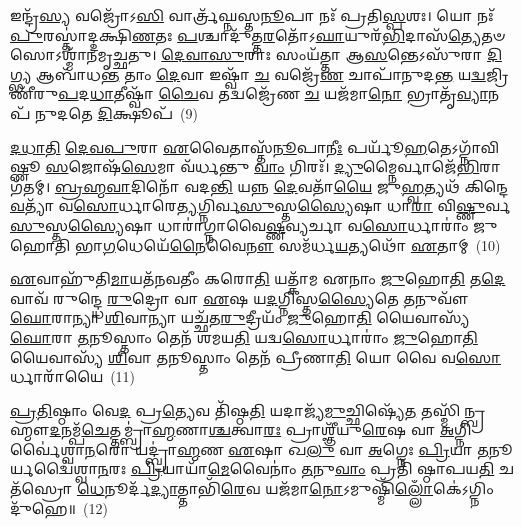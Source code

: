 {\anuvakamend[{\-\ul{𑌪𑍍𑌰𑌾}\-\-\ul{𑌜𑌾}\-\-\ul{𑌪}\-𑌤𑍍𑌯𑌾\-\ul{𑌲𑍍𑌲𑍋𑌁}\-𑌕𑌾𑌯᳴ 𑌦𑍇𑌵𑌾𑌃 𑌪𑌿𑌤𑍋 𑌦𑌧𑍍𑌯𑌾𑌦𑌾𑌗𑍍𑌰\-\ul{𑌯}\-𑌣𑌂 𑌪𑌞𑍍𑌚᳴𑌵𑌿𑍞𑌶𑌤𑌿𑌶𑍍𑌚}]}%

𑌇𑌨𑍍𑌦𑍍𑌰᳴\-\ul{𑌸𑍍𑌯} 𑌵𑌜𑍍𑌰𑍋᳴\-𑌽\-\ul{𑌸𑌿} 𑌵𑌾𑌰𑍍𑌤𑍍𑌰᳴𑌘𑍍𑌨𑌸𑍍𑌤\-\ul{𑌨𑍂}\-𑌪𑌾 𑌨𑌃᳴ 𑌪𑍍𑌰𑌤𑌿\-\ul{𑌸𑍍𑌪}\-𑌶𑌃। 𑌯𑍋 𑌨𑌃᳴ \ul{𑌪𑍁}\-𑌰𑌸𑍍𑌤𑌾॑𑌦𑍍𑌦𑌕𑍍𑌷𑌿\-\ul{𑌣}\-𑌤𑌃 \ul{𑌪}\-𑌶𑍍𑌚𑌾𑌦𑍁᳴𑌤𑍍𑌤\-\ul{𑌰}\-𑌤𑍋᳴\-𑌽\-\ul{𑌘𑌾}\-𑌯𑍁𑌰᳴\-\ul{𑌭𑌿}\-𑌦𑌾𑌸᳴\-\ul{𑌤𑍍𑌯𑍇}\-𑌤𑍞 𑌸𑍋\-𑌽𑌶𑍍𑌮𑌾᳴𑌨𑌮𑍃𑌚𑍍𑌛𑌤𑍁। \ul{𑌦𑍇}\-\-\ul{𑌵𑌾}\-\-\ul{𑌸𑍁}\-𑌰𑌾𑌃 𑌸𑌂𑌯᳴𑌤𑍍𑌤𑌾 𑌆\-\ul{𑌸}\-𑌨𑍍𑌤𑍇\-𑌽𑌸𑍁᳴𑌰𑌾 \ul{𑌦𑌿}\-𑌗𑍍𑌭𑍍𑌯 𑌆𑌬𑌾᳴𑌧\-\ul{𑌨𑍍𑌤} 𑌤𑌾𑌂 \ul{𑌦𑍇}\-𑌵𑌾 𑌇𑌷𑍍𑌵𑌾᳴ \ul{𑌚} 𑌵𑌜𑍍𑌰𑍇᳴\-\ul{𑌣} 𑌚𑌾𑌪𑌾᳴𑌨𑍁𑌦\-\ul{𑌨𑍍𑌤} 𑌯\-\ul{𑌦𑍍𑌵}\-𑌜𑍍𑌰𑌿𑌣𑍀᳴𑌰𑍁\-\ul{𑌪}\-𑌦\-\ul{𑌧𑌾}\-𑌤𑍀𑌷𑍍𑌵𑌾᳴ \ul{𑌚𑍈}\-𑌵 𑌤𑌦𑍍𑌵𑌜𑍍𑌰𑍇᳴𑌣 \ul{𑌚} 𑌯𑌜᳴𑌮𑌾\-\ul{𑌨𑍋} 𑌭𑍍𑌰𑌾𑌤𑍃᳴\-\ul{𑌵𑍍𑌯𑌾}\-𑌨𑌪᳴ 𑌨𑍁𑌦𑌤𑍇 \ul{𑌦𑌿}\-𑌕𑍍𑌷𑍂𑌪᳴~(9)

\-\ul{𑌦}\-\-\ul{𑌧𑌾}\-\-\ul{𑌤𑌿} \ul{𑌦𑍇}\-\-\ul{𑌵}\-\-\ul{𑌪𑍁}\-𑌰𑌾 \ul{𑌏}\-𑌵𑍈𑌤𑌾𑌸𑍍𑌤᳴\-\ul{𑌨𑍂}\-𑌪𑌾\-\ul{𑌨𑍀𑌃} 𑌪𑌰𑍍𑌯𑍂᳴\-\ul{𑌹}\-𑌤𑍇\-𑌽𑌗𑍍𑌨𑌾᳴𑌵𑌿𑌷𑍍𑌣𑍂 \ul{𑌸}\-𑌜𑍋𑌷᳴\-\ul{𑌸𑍇}\-𑌮𑌾 𑌵᳴𑌰𑍍𑌧𑌨𑍍𑌤𑍁 \ul{𑌵𑌾𑌂} 𑌗𑌿𑌰𑌃᳴। \ul{𑌦𑍍𑌯𑍁}\-𑌮𑍍𑌨𑍈𑌰𑍍𑌵𑌾𑌜𑍇᳴\-\ul{𑌭𑌿}\-𑌰𑌾 𑌗᳴𑌤𑌮𑍍। \ul{𑌬𑍍𑌰}\-\-\ul{𑌹𑍍𑌮}\-\-\ul{𑌵𑌾}\-𑌦𑌿𑌨𑍋᳴ 𑌵𑌦\-\ul{𑌨𑍍𑌤𑌿} 𑌯𑌨𑍍𑌨 \ul{𑌦𑍇}\-𑌵𑌤𑌾᳴\-\ul{𑌯𑍈} 𑌜𑍁\-\ul{𑌹𑍍𑌵}\-𑌤𑍍𑌯𑌥᳴ 𑌕𑌿𑌨𑍍𑌦𑍇\-\ul{𑌵}\-𑌤𑍍𑌯𑌾᳴ 𑌵\-\ul{𑌸𑍋}\-𑌰𑍍𑌧𑌾𑌰𑍇\-\ul{𑌤𑍍𑌯}\-𑌗𑍍𑌨𑌿𑌰𑍍𑌵\-\ul{𑌸𑍁}\-𑌸𑍍𑌤\-\ul{𑌸𑍍𑌯𑍈}\-𑌷𑌾 𑌧𑌾\-\ul{𑌰𑌾} 𑌵𑌿\-\ul{𑌷𑍍𑌣𑍁}\-𑌰𑍍𑌵\-\ul{𑌸𑍁}\-𑌸𑍍𑌤\-\ul{𑌸𑍍𑌯𑍈}\-𑌷𑌾 𑌧𑌾𑌰𑌾॑𑌗𑍍𑌨𑌾𑌵𑍈\-\ul{𑌷𑍍𑌣}\-𑌵𑍍𑌯𑌰𑍍𑌚𑌾 𑌵\-\ul{𑌸𑍋}\-𑌰𑍍𑌧𑌾𑌰𑌾𑌂॑ 𑌜𑍁𑌹𑍋𑌤𑌿 𑌭𑌾\-\ul{𑌗}\-𑌧𑍇𑌯𑍇᳴\-\ul{𑌨𑍈}\-𑌵𑍈\-\ul{𑌨𑍗} 𑌸𑌮᳴𑌰𑍍𑌧\-\ul{𑌯}\-𑌤𑍍𑌯𑌥𑍋᳴ \ul{𑌏}\-𑌤𑌾𑌮𑍍~(10)

\-\ul{𑌏}\-𑌵𑌾𑌹𑍁᳴𑌤𑌿\-\ul{𑌮𑌾}\-𑌯𑌤᳴𑌨𑌵𑌤𑍀𑌂 𑌕𑌰𑍋\-\ul{𑌤𑌿} 𑌯𑌤𑍍𑌕𑌾᳴𑌮 𑌏𑌨𑌾𑌂 \ul{𑌜𑍁}\-𑌹𑍋\-\ul{𑌤𑌿} 𑌤\-\ul{𑌦𑍇}\-𑌵𑌾𑌵᳴ 𑌰𑍁𑌨𑍍𑌦𑍍𑌧𑍇 \ul{𑌰𑍁}\-𑌦𑍍𑌰𑍋 𑌵𑌾 \ul{𑌏}\-𑌷 𑌯\-\ul{𑌦}\-𑌗𑍍𑌨𑌿𑌸𑍍𑌤\-\ul{𑌸𑍍𑌯𑍈}\-𑌤𑍇 \ul{𑌤}\-𑌨𑍁𑌵𑍗᳴ \ul{𑌘𑍋}\-𑌰𑌾𑌨𑍍𑌯𑌾 \ul{𑌶𑌿}\-𑌵𑌾𑌨𑍍𑌯𑌾 𑌯𑌚𑍍𑌛᳴𑌤\-\ul{𑌰𑍁}\-𑌦𑍍𑌰𑍀𑌯𑌂᳴ \ul{𑌜𑍁}\-𑌹𑍋\-\ul{𑌤𑌿} 𑌯𑍈𑌵𑌾𑌸𑍍𑌯᳴ \ul{𑌘𑍋}\-𑌰𑌾 \ul{𑌤}\-𑌨𑍂𑌸𑍍𑌤𑌾𑌂 𑌤𑍇𑌨᳴ 𑌶𑌮𑌯\-\ul{𑌤𑌿} 𑌯𑌦𑍍𑌵\-\ul{𑌸𑍋}\-𑌰𑍍𑌧𑌾𑌰𑌾𑌂॑ \ul{𑌜𑍁}\-𑌹𑍋\-\ul{𑌤𑌿} 𑌯𑍈𑌵𑌾𑌸𑍍𑌯᳴ \ul{𑌶𑌿}\-𑌵𑌾 \ul{𑌤}\-𑌨𑍂𑌸𑍍𑌤𑌾𑌂 𑌤𑍇𑌨᳴ 𑌪𑍍𑌰𑍀𑌣𑌾\-\ul{𑌤𑌿} 𑌯𑍋 𑌵𑍈 𑌵\-\ul{𑌸𑍋}\-𑌰𑍍𑌧𑌾𑌰𑌾᳴𑌯𑍈~(11)

\-\ul{𑌪𑍍𑌰}\-\-\ul{𑌤𑌿}\-𑌷𑍍𑌠𑌾𑌂 𑌵𑍇\-\ul{𑌦} 𑌪𑍍𑌰\-\ul{𑌤𑍍𑌯𑍇}\-𑌵 𑌤𑌿᳴𑌷𑍍𑌠\-\ul{𑌤𑌿} 𑌯𑌦𑌾𑌜𑍍𑌯᳴\-\ul{𑌮𑍁}\-𑌚𑍍𑌛𑌿𑌷𑍍𑌯𑍇᳴\-\ul{𑌤} 𑌤𑌸𑍍𑌮𑌿᳴𑌨𑍍𑌬𑍍𑌰𑌹𑍍𑌮𑍗\-\ul{𑌦}\-𑌨𑌮𑍍𑌪᳴\-\ul{𑌚𑍇}\-𑌤𑍍𑌤𑌮𑍍𑌬𑍍𑌰𑌾॑\-\ul{𑌹𑍍𑌮}\-𑌣𑌾\-\ul{𑌶𑍍𑌚}\-𑌤𑍍𑌵𑌾\-\ul{𑌰𑌃} 𑌪𑍍𑌰𑌾𑌶𑍍𑌞𑍀᳴𑌯𑍁\-\ul{𑌰𑍇}\-𑌷 𑌵𑌾 \ul{𑌅}\-𑌗𑍍𑌨𑌿𑌰𑍍𑌵𑍈॑𑌶𑍍𑌵𑌾\-\ul{𑌨}\-𑌰𑍋 𑌯𑌦𑍍𑌬𑍍𑌰𑌾॑\-\ul{𑌹𑍍𑌮}\-𑌣 \ul{𑌏}\-𑌷𑌾 𑌖\-\ul{𑌲𑍁} 𑌵𑌾 \ul{𑌅}\-𑌗𑍍𑌨𑍇𑌃 \ul{𑌪𑍍𑌰𑌿}\-𑌯𑌾 \ul{𑌤}\-𑌨𑍂𑌰𑍍𑌯𑌦𑍍𑌵𑍈॑𑌶𑍍𑌵𑌾\-\ul{𑌨}\-𑌰𑌃 \ul{𑌪𑍍𑌰𑌿}\-𑌯𑌾𑌯𑌾᳴\-\ul{𑌮𑍇}\-𑌵𑍈𑌨𑌾𑌂॑ \ul{𑌤}\-𑌨𑍁\-\ul{𑌵𑌾𑌂} 𑌪𑍍𑌰𑌤𑌿᳴ 𑌷𑍍𑌠𑌾𑌪𑌯\-\ul{𑌤𑌿} 𑌚𑌤᳴𑌸𑍍𑌰𑍋 \ul{𑌧𑍇}\-𑌨𑍂𑌰𑍍𑌦᳴\-\ul{𑌦𑍍𑌯𑌾}\-𑌤𑍍𑌤𑌾𑌭𑌿᳴\-\ul{𑌰𑍇}\-𑌵 𑌯𑌜᳴𑌮𑌾\-\ul{𑌨𑍋}\-\-𑌽𑌮𑍁𑌷𑍍𑌮𑌿᳴\-\ul{𑌲𑍍𑌲𑍋𑌁}\-𑌕𑍇॑\-𑌽𑌗𑍍𑌨𑌿𑌂 𑌦𑍁᳴𑌹𑍇॥~(12)

{\anuvakamend[{𑌉\-\ul{𑌪𑍈}\-𑌤𑌾𑌨𑍍𑌧𑌾𑌰𑌾᳴\-\ul{𑌯𑍈} 𑌷𑌟𑍍𑌚᳴𑌤𑍍𑌵𑌾𑌰𑌿𑍞𑌶𑌚𑍍𑌚}]}%


